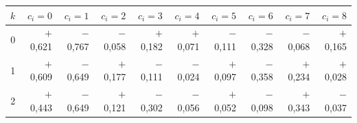 \begin{tabular}{rrrrrrrrrr}
\toprule
$k$ & $c_i{=}0$ & $c_i{=}1$ & $c_i{=}2$ & $c_i{=}3$ & $c_i{=}4$ & $c_i{=}5$ & $c_i{=}6$ & $c_i{=}7$ & $c_i{=}8$ \\
\midrule
0 & $+$0,621 & $-$0,767 & $-$0,058 & $+$0,182 & $+$0,071 & $-$0,111 & $-$0,328 & $-$0,068 & $+$0,165 \\
1 & $+$0,609 & $-$0,649 & $+$0,177 & $-$0,111 & $-$0,024 & $+$0,097 & $-$0,358 & $+$0,234 & $+$0,028 \\
2 & $+$0,443 & $-$0,649 & $+$0,121 & $-$0,302 & $-$0,056 & $+$0,052 & $-$0,098 & $+$0,343 & $-$0,037 \\
\bottomrule
\end{tabular}
